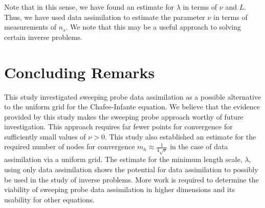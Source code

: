 \documentclass[12pt]{amsart}
\theoremstyle{plain}
\theoremstyle{definition}
\theoremstyle{remark}
\numberwithin{equation}{section} %
\numberwithin{figure}{section}   %
\begin{document}
Note that in this sense, we have found an estimate for $\lambda$ in terms of $\nu$ and $L$. Thus, we have used data assimilation to estimate the parameter $\nu$ in terms of measurements of $n_s$. We note that this may be a useful approach to solving certain inverse problems.

\section{Concluding Remarks}
This study investigated sweeping probe data assimilation as a possible alternative to the uniform grid for the Chafee-Infante equation. We believe that the evidence provided by this study makes the sweeping probe approach worthy of future investigation. This approach requires far fewer points for convergence for sufficiently small values of $\nu>0$. This study also established an estimate for the required number of nodes for convergence $m_h \approx \frac{1}{4\sqrt{\nu}}$ in the case of data assimilation via a uniform grid. The estimate for the minimum length scale, $\lambda$, using only data assimilation shows the potential for data assimilation to possibly be used in the study of inverse problems. More work is required to determine the viability of sweeping probe data assimilation in higher dimensions and its usability for other equations. 
\clearpage
% 
%



\end{document}
